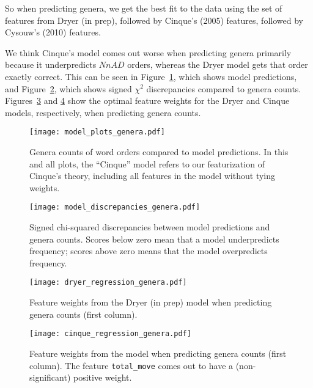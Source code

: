 \documentclass[11pt]{article}
\begin{document}
So when predicting genera, we get the best fit to the data using the set of features from Dryer (in prep), followed by Cinque's (2005) features, followed by Cysouw's (2010) features.

We think Cinque's model comes out worse when predicting genera primarily because it underpredicts $NnAD$ orders, whereas the Dryer model gets that order exactly correct. This can be seen in Figure~\ref{fig:genera-predictions}, which shows model predictions, and Figure~\ref{fig:genera-discrepancies}, which shows signed $\chi^2$ discrepancies compared to genera counts.
Figures~\ref{fig:dryer-model-genera} and \ref{fig:cinque-model-genera} show the optimal feature weights for the Dryer and Cinque models, respectively, when predicting genera counts.

\begin{figure}[ht!]
  \centering
  \texttt{[image: model\_plots\_genera.pdf]}
  \caption{Genera counts of word orders compared to model predictions. In this and all plots, the ``Cinque'' model refers to our featurization of Cinque's theory, including all features in the model without tying weights.}
  \label{fig:genera-predictions}
\end{figure}

\begin{figure}[ht!]
  \centering
  \texttt{[image: model\_discrepancies\_genera.pdf]}
  \caption{Signed chi-squared discrepancies between model predictions and genera counts. Scores below zero mean that a model underpredicts frequency; scores above zero means that the model overpredicts frequency.}
  \label{fig:genera-discrepancies}
\end{figure}

\begin{figure}[ht!]
  \centering
  \texttt{[image: dryer\_regression\_genera.pdf]}
  \caption{Feature weights from the Dryer (in prep) model when predicting genera counts (first column).}
  \label{fig:dryer-model-genera}
\end{figure}

\begin{figure}[ht!]
  \centering
  \texttt{[image: cinque\_regression\_genera.pdf]}
  \cprotect\caption{Feature weights from the \citet{cinque2005deriving} model when predicting genera counts (first column). The feature \verb+total_move+ comes out to have a (non-significant) positive weight.}
  \label{fig:cinque-model-genera}
\end{figure}
\end{document}
